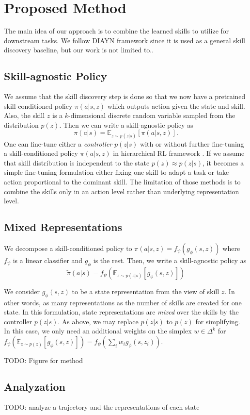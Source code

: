 \section{Proposed Method}
The main idea of our approach is to combine the learned skills to utilize for downstream tasks. We follow DIAYN \cite{eysenbach2018diversity} framework since it is used as a general skill discovery baseline, but our work is not limited to..

\subsection{Skill-agnostic Policy}


We assume that the skill discovery step is done so that we now have a pretrained skill-conditioned policy $\pi(a|s,z)$ which outputs action given the state and skill. Also, the skill $z$ is a $k$-dimensional discrete random variable sampled from the distribution $p(z)$. Then we can write a skill-agnostic policy as
\begin{equation}
    \pi(a|s) = \mathbb{E}_{z \sim p(z|s)}[\pi(a|s,z)].
\end{equation}
One can fine-tune either a \emph{controller} $p(z|s)$ with or without further fine-tuning a skill-conditioned policy $\pi(a|s,z)$ in hierarchical RL framework \cite{sharma2019dynamics}. If we assume that skill distribution is independent to the state $p(z) \approx p(z|s)$, it becomes a simple fine-tuning formulation either fixing one skill to adapt a task or take action proportional to the dominant skill. The limitation of those methods is to combine the skills only in an action level rather than underlying representation level.

\subsection{Mixed Representations}
We decompose a skill-conditioned policy to $\pi(a|s,z) = f_{\psi}(g_{\phi}(s, z))$ where $f_{\psi}$ is a linear classifier and $g_{\phi}$ is the rest. Then, we write a skill-agnostic policy as
\begin{equation}
    \tilde{\pi}(a|s) = f_{\psi}(\mathbb{E}_{z \sim p(z|s)}[g_{\phi}(s,z)])
\end{equation}

We consider $g_{\phi}(s, z)$ to be a state representation from the view of skill $z$. In other words, as many representations as the number of skills are created for one state. In this formulation, state representations are \emph{mixed} over the skills by the controller $p(z|s)$. As above, we may replace $p(z|s)$ to $p(z)$ for simplifying. In this case, we only need an additional weights on the simplex $w \in \Delta^k$ for $f_{\psi}(\mathbb{E}_{z \sim p(z)}[g_{\phi}(s,z)]) = f_{\psi}(\sum_i w_i g_{\phi}(s,z_i))$. 

TODO: Figure for method

\subsection{Analyzation}
TODO: analyze a trajectory and the representations of each state


